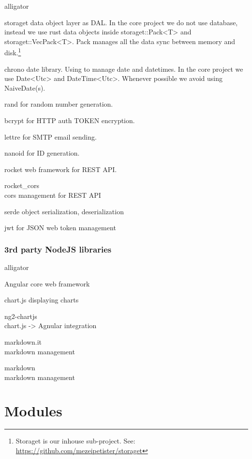 \documentclass{article}
\begin{document}
\begin{labeling}{alligator}
  \item [storaget] data object layer as DAL. In the core project we do
    not use database, instead we use rust data objects inside
    storaget::Pack<T> and storaget::VecPack<T>. Pack manages all the
    data sync between memory and disk.\footnote{Storaget is our inhouse sub-project. See: \url{https://github.com/mezeipetister/storaget}}
  \item [chrono] date library. Using to manage date and datetimes. In
    the core project we use Date<Utc> and DateTime<Utc>. Whenever possible
    we avoid using NaiveDate(s).
  \item [rand] for random number generation.
  \item [bcrypt] for HTTP auth TOKEN encryption.
  \item [lettre] for SMTP email sending.
  \item [nanoid] for ID generation.
  \item [rocket] web framework for REST API.
  \item [rocket\_cors] \hfill \\ cors management for REST API
  \item [serde] object serialization, deserialization
  \item [jwt] for JSON web token management
\end{labeling}

\subsubsection{3rd party NodeJS libraries}

\begin{labeling}{alligator}
  \item [Angular] core web framework
  \item [chart.js] displaying charts
  \item [ng2-chartjs] \hfill \\ chart.js -> Agnular integration
  \item [markdown.it] \hfill \\ markdown management
  \item [markdown] \hfill \\ markdown management
\end{labeling}

\newpage

\section{Modules}
\end{document}
